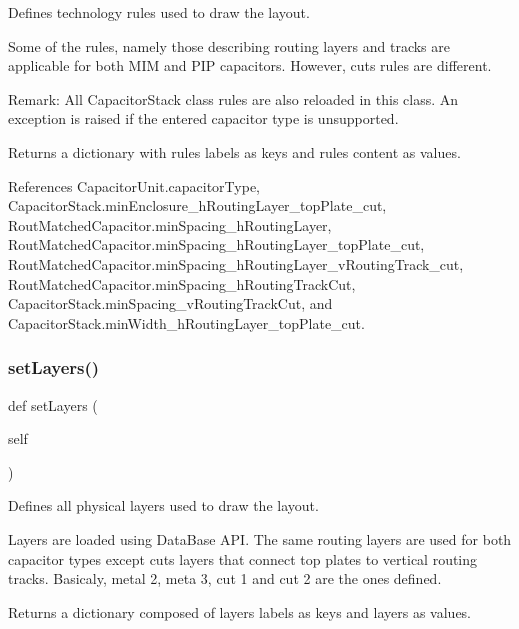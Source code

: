 Defines technology rules used to draw the layout. 

Some of the rules, namely those describing routing layers and tracks are applicable for both M\+IM and P\+IP capacitors. However, cuts rules are different.

\begin{DoxyParagraph}{Remark\+: All {\ttfamily Capacitor\+Stack} class rules are also reloaded in this class.}
An exception is raised if the entered capacitor type is unsupported.
\end{DoxyParagraph}
\begin{DoxyReturn}{Returns}
a dictionary with rules labels as keys and rules content as values. 
\end{DoxyReturn}


References Capacitor\+Unit.\+capacitor\+Type, Capacitor\+Stack.\+min\+Enclosure\+\_\+h\+Routing\+Layer\+\_\+top\+Plate\+\_\+cut, Rout\+Matched\+Capacitor.\+min\+Spacing\+\_\+h\+Routing\+Layer, Rout\+Matched\+Capacitor.\+min\+Spacing\+\_\+h\+Routing\+Layer\+\_\+top\+Plate\+\_\+cut, Rout\+Matched\+Capacitor.\+min\+Spacing\+\_\+h\+Routing\+Layer\+\_\+v\+Routing\+Track\+\_\+cut, Rout\+Matched\+Capacitor.\+min\+Spacing\+\_\+h\+Routing\+Track\+Cut, Capacitor\+Stack.\+min\+Spacing\+\_\+v\+Routing\+Track\+Cut, and Capacitor\+Stack.\+min\+Width\+\_\+h\+Routing\+Layer\+\_\+top\+Plate\+\_\+cut.

\mbox{\label{classpython_1_1capacitorrouted_1_1RoutMatchedCapacitor_a9fd411594953ae1c5be7025f258d4354}} 
\subsubsection{\texorpdfstring{set\+Layers()}{setLayers()}}
{\footnotesize\ttfamily def set\+Layers (\begin{DoxyParamCaption}\item[{}]{self }\end{DoxyParamCaption})}



Defines all physical layers used to draw the layout. 

Layers are loaded using {\ttfamily Data\+Base} A\+PI. The same routing layers are used for both capacitor types except cuts layers that connect top plates to vertical routing tracks. Basicaly, metal 2, meta 3, cut 1 and cut 2 are the ones defined. \begin{DoxyReturn}{Returns}
a dictionary composed of layers labels as keys and layers as values. 
\end{DoxyReturn}


